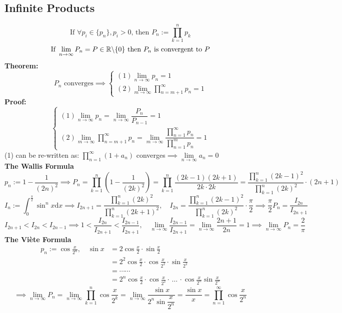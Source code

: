 \documentclass{article}
\newcommand{\R}{\mathbb{R}}
\newcommand{\0}{{\bf{0}}}
\begin{document}
\subsection{Infinite Products}
$$\mbox{If }\forall p_i\in\{p_n\},p_i>0\mbox{, then }P_n:=\prod_{k=1}^np_k$$
$$\mbox{If }\lim_{n\to\infty}P_n=P\in\R\symbol{92}\{0\}\mbox{ then }P_n\mbox{ is convergent to }P$$
\textbf{Theorem:}
$$P_n\mbox{ converges}\implies\begin{cases}
    (1)\lim\limits_{n\to\infty}p_n=1\\
    (2)\lim\limits_{m\to\infty}\prod\limits_{n=m+1}^\infty p_n=1
\end{cases}$$
\textbf{Proof:}
$$\begin{cases}
    (1)\lim\limits_{n\to\infty}p_n=\lim\limits_{n\to\infty}\dfrac{P_n}{P_{n-1}}=1\\
    (2)\lim\limits_{m\to\infty}\prod\limits_{n=m+1}^\infty p_n=\lim\limits_{m\to\infty}\dfrac{\prod\limits_{n=1}^\infty p_n}{\prod\limits_{n=1}^mp_n}=1
\end{cases}$$
(1) can be re-written as: $\prod\limits_{n=1}^\infty(1+a_n)$ converges$\implies\lim\limits_{n\to\infty}a_n=0$
$$$$
\textbf{The Wallis Formula}
$$p_n:=1-\frac{1}{(2n)^2}\implies P_n=\prod_{k=1}^n\left(1-\frac{1}{(2k)^2}\right)=\prod_{k=1}^n\frac{(2k-1)(2k+1)}{2k\cdot 2k}=\frac{\prod\limits_{k=1}^n(2k-1)^2}{\prod\limits_{k=1}^n(2k)^2}\cdot (2n+1)$$
$$I_n:=\int_0^\frac{\pi}{2}\sin^nx\mbox{d}x\implies I_{2n+1}=\frac{\prod\limits_{k=1}^n(2k)^2}{\prod\limits_{k=1}^n(2k+1)^2},\quad I_{2n}=\frac{\prod\limits_{k=1}^n(2k-1)^2}{\prod\limits_{k=1}^n(2k)^2}\cdot\frac{\pi}{2}\implies\frac{\pi}{2}P_n=\frac{I_{2n}}{I_{2n+1}}$$
$$I_{2n+1}<I_{2n}<I_{2n-1}\implies1<\frac{I_{2n}}{I_{2n+1}}<\frac{I_{2n-1}}{I_{2n+1}},\quad\lim_{n\to\infty}\frac{I_{2n-1}}{I_{2n+1}}=\lim_{n\to\infty}\frac{2n+1}{2n}=1\implies\lim_{n\to\infty}P_n=\frac{2}{\pi}$$
\textbf{The Viète Formula}
\begin{equation}
\begin{split}
    p_n:=\cos\frac{x}{2^n},\quad\sin x&=2\cos\frac{x}{2}\cdot\sin\frac{x}{2}\\
    &=2^2\cos\frac{x}{2}\cdot\cos\frac{x}{2^2}\cdot\sin\frac{x}{2^2}\\
    &=\cdots\cdots\\
    &=2^n\cos\frac{x}{2}\cdot\cos\frac{x}{2^2}\cdot\,\dots\,\cdot\cos\frac{x}{2^n}\sin\frac{x}{2^n}
\end{split}
\end{equation}
$$\implies\lim_{n\to\infty}P_n=\lim_{n\to\infty}\prod_{k=1}^n\cos\frac{x}{2^k}=\lim_{n\to\infty}\dfrac{\sin x}{2^n\sin\dfrac{x}{2^n}}=\frac{\sin x}{x}=\prod_{n=1}^\infty\cos\frac{x}{2^n}$$
\end{document}
